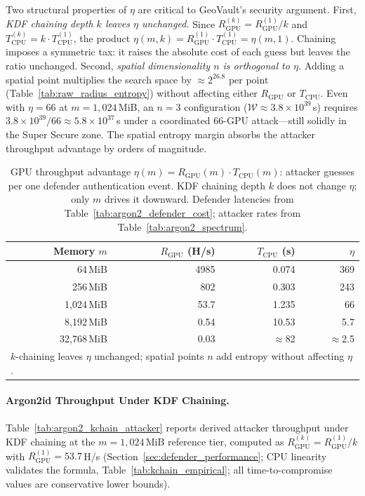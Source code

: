 \documentclass[journal,article,accept,pdftex,moreauthors]{Definitions/mdpi}
\begin{document}
Two structural properties of $\eta$ are critical to GeoVault's security argument.
First, \emph{KDF chaining depth $k$ leaves $\eta$ unchanged.} Since $R_\text{GPU}^{(k)} = R_\text{GPU}^{(1)}/k$ and $T_\text{CPU}^{(k)} = k\cdot T_\text{CPU}^{(1)}$, the product $\eta(m,k) = R_\text{GPU}^{(1)}\cdot T_\text{CPU}^{(1)} = \eta(m,1)$. Chaining imposes a symmetric tax: it raises the absolute cost of each guess but leaves the ratio unchanged.
Second, \emph{spatial dimensionality $n$ is orthogonal to $\eta$.} Adding a spatial point multiplies the search space by $\approx\!2^{26.8}$ per point (Table~\ref{tab:raw_radius_entropy}) without affecting either $R_\text{GPU}$ or $T_\text{CPU}$. Even with $\eta = 66$ at $m=1{,}024$\,MiB, an $n=3$ configuration ($\mathcal{W}\approx 3.8\times10^{39}$\,s) requires $3.8\times10^{39}/66 \approx 5.8\times10^{37}$\,s under a coordinated 66-GPU attack---still solidly in the Super Secure zone. The spatial entropy margin absorbs the attacker throughput advantage by orders of magnitude.

\begin{table}[H]
\caption{GPU throughput advantage $\eta(m) = R_\text{GPU}(m)\cdot T_\text{CPU}(m)$: attacker guesses per one defender authentication event. KDF chaining depth $k$ does not change $\eta$; only $m$ drives it downward. Defender latencies from Table~\ref{tab:argon2_defender_cost}; attacker rates from Table~\ref{tab:argon2_spectrum}.}
\label{tab:eta}
\centering
\begin{tabular}{rrrr}
\toprule
\textbf{Memory $m$} & \textbf{$R_\text{GPU}$ (H/s)} & \textbf{$T_\text{CPU}$ (s)} & \textbf{$\eta$} \\
\midrule
64\,MiB      & 4985  & 0.074 & 369 \\
256\,MiB     & 802   & 0.303 & 243 \\
1{,}024\,MiB & 53.7  & 1.235 &  66 \\
8{,}192\,MiB & 0.54  & 10.53 & 5.7 \\
32{,}768\,MiB & 0.03 & $\approx$82 & $\approx$2.5 \\
\bottomrule
\multicolumn{4}{l}{\footnotesize $k$-chaining leaves $\eta$ unchanged; spatial points $n$ add entropy without affecting $\eta$.}
\end{tabular}
\end{table}

\paragraph{Argon2id Throughput Under KDF Chaining.}
Table~\ref{tab:argon2_kchain_attacker} reports derived attacker throughput under KDF chaining at the $m=1{,}024$\,MiB reference tier, computed as $R_\text{GPU}^{(k)} = R_\text{GPU}^{(1)} / k$ with $R_\text{GPU}^{(1)} = 53.7$\,H/s (Section~\ref{sec:defender_performance}; CPU linearity validates the formula, Table~\ref{tab:kchain_empirical}; all time-to-compromise values are conservative lower bounds).
\end{document}
